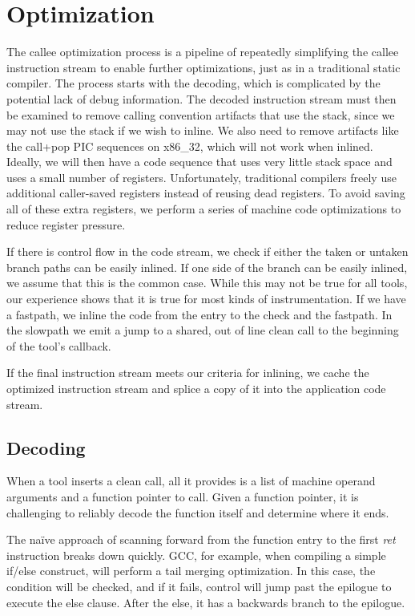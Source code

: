 \chapter{Optimization}

The callee optimization process is a pipeline of repeatedly simplifying the
callee instruction stream to enable further optimizations, just as in a
traditional static compiler.  The process starts with the decoding, which is
complicated by the potential lack of debug information.  The decoded
instruction stream must then be examined to remove calling convention artifacts
that use the stack, since we may not use the stack if we wish to inline.  We
also need to remove artifacts like the call+pop PIC sequences on x86\_32, which
will not work when inlined.  Ideally, we will then have a code sequence that
uses very little stack space and uses a small number of registers.
Unfortunately, traditional compilers freely use additional caller-saved
registers instead of reusing dead registers.  To avoid saving all of these
extra registers, we perform a series of machine code optimizations to reduce
register pressure.

If there is control flow in the code stream, we check if either the taken or
untaken branch paths can be easily inlined.  If one side of the branch can be
easily inlined, we assume that this is the common case.  While this may not be
true for all tools, our experience shows that it is true for most kinds of
instrumentation.  If we have a fastpath, we inline the code from the entry to
the check and the fastpath.  In the slowpath we emit a jump to a shared, out of
line clean call to the beginning of the tool's callback.

If the final instruction stream meets our criteria for inlining, we cache the
optimized instruction stream and splice a copy of it into the application code
stream.

\section{Decoding}

When a tool inserts a clean call, all it provides is a list of machine operand
arguments and a function pointer to call.  Given a function pointer, it is
challenging to reliably decode the function itself and determine where it ends.

The na\"ive approach of scanning forward from the function entry to the first
{\em ret} instruction breaks down quickly.  GCC, for example, when compiling a
simple if/else construct, will perform a tail merging optimization.  In this
case, the condition will be checked, and if it fails, control will jump past the
epilogue to execute the else clause.  After the else, it has a backwards branch
to the epilogue.

